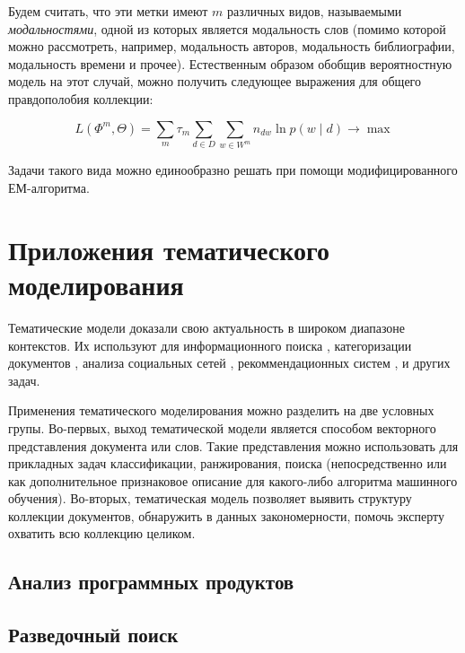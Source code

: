 Будем считать, что эти метки имеют $m$ различных видов, называемыми  \textit{модальностями}, одной из которых является модальность слов (помимо которой можно рассмотреть, например, модальность авторов, модальность библиографии, модальность времени и прочее). Естественным образом обобщив вероятностную модель на этот случай, можно получить следующее выражения для общего правдополобия коллекции:

\[
L(\Phi^m, \Theta) = \sum_m \tau_m \sum_{d\in D} \sum_{w \in W^m} n_{dw} \ln p(w \mid d) \rightarrow \max
\]

Задачи такого вида можно единообразно решать при помощи модифицированного ЕМ-алгоритма.

\section{Приложения тематического моделирования}



Тематические модели доказали свою актуальность в широком диапазоне контекстов\cite{fntir}. Их используют для информационного поиска \cite{yi2009, wang2011}, категоризации документов \cite{rubin2012}, анализа социальных сетей \cite{varshney2014, pinto2016}, рекоммендационных систем \cite{wang2011}, \cite{lee2015} и других задач.

Применения тематического моделирования можно разделить на две условных групы. Во-первых, выход тематической модели является способом векторного представления документа или слов. Такие представления можно использовать для прикладных задач классификации, ранжирования, поиска (непосредственно или как дополнительное признаковое описание для какого-либо алгоритма машинного обучения). Во-вторых, тематическая модель позволяет выявить структуру коллекции документов, обнаружить в данных закономерности, помочь эксперту охватить всю коллекцию целиком.

\subsection{Анализ программных продуктов}

\cite{mml0}

\subsection{Разведочный поиск}

